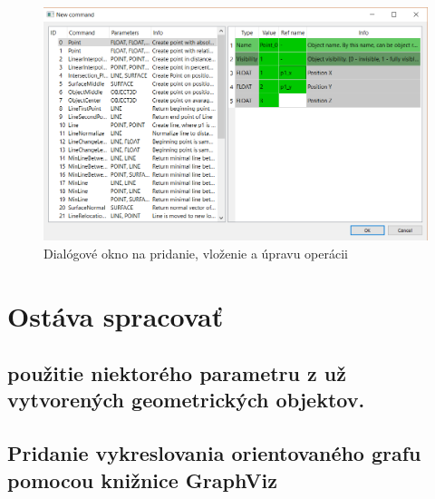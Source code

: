 \begin{figure}[hbt]
	\centering
	\includegraphics[width=1\textwidth]{obrazky-figures/Dialog.png}
	\caption{Dialógové okno na pridanie, vloženie a úpravu operácii}
	\label{fig:dialogWindow}
\end{figure}

\chapter{Ostáva spracovať}



\section{použitie niektorého parametru z už vytvorených geometrických objektov.}


\section{Pridanie vykreslovania orientovaného grafu pomocou knižnice GraphViz}



